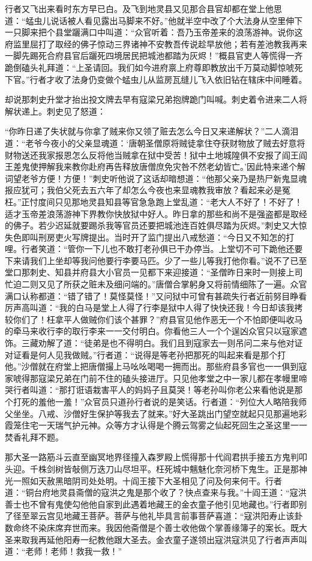\documentclass[12pt,UTF8]{ctexbook}
\begin{document}
{	行者又飞出来看时东方早已白。及飞到地灵县又见那合县官却都在堂上他思道：“蜢虫儿说话被人看见露出马脚来不好。”他就半空中改了个大法身从空里伸下一只脚来把个县堂躧满口中叫道：“众官听着：吾乃玉帝差来的浪荡游神。说你这府监里屈打了取经的佛子惊动三界诸神不安教吾传说趁早放他；若有差池教我再来一脚先踢死合府县官后躧死四境居民把城池都踏为灰烬！”概县官吏人等慌得一齐跪倒磕头礼拜道：“上圣请回。我们如今进府禀上府尊即教放出千万莫动脚惊唬死下官。”行者才收了法身仍变做个蜢虫儿从监房瓦缝儿飞入依旧钻在辖床中间睡着。
	
	却说那刺史升堂才抬出投文牌去早有寇梁兄弟抱牌跪门叫喊。刺史着令进来二人将解状递上。刺史见了怒道：
	
	“你昨日递了失状就与你拿了贼来你又领了赃去怎么今日又来递解状？”二人滴泪道：“老爷今夜小的父亲显魂道：‘唐朝圣僧原将贼徒拿住夺获财物放了贼去好意将财物送还我家报恩怎么反将他当贼拿在狱中受苦！狱中土地城隍俱不安报了阎王阎王差鬼使押解我来教你赴府再告释放唐僧庶免灾咎不然老幼皆亡。’因此特来递个解词望老爷方便！方便！”刺史听他说了这话却暗想道：“他那父亲乃是热尸新鬼显魂报应犹可；我伯父死去五六年了却怎么今夜也来显魂教我审放？看起来必是冤枉。”正忖度间只见那地灵县知县等官急急跑上堂乱道：“老大人不好了！不好了！适才玉帝差浪荡游神下界教你快放狱中好人。昨日拿的那些和尚不是强盗都是取经的佛子。若少迟延就要踢杀我等官员还要把城池连百姓俱尽踏为灰烬。”刺史又大惊失色即叫刑房吏火写牌提出。当时开了监门提出八戒愁道：“今日又不知怎的打哩。行者笑道：“管你一下儿也不敢打老孙俱已干办停当。上堂切不可下跪他还要下来请我们上坐却等我问他要行李要马匹。少了一些儿等我打他你看。”说不了已至堂口那刺史、知县并府县大小官员一见都下来迎接道：“圣僧昨日来时一则接上司忙迫二则又见了所获之赃未及细问端的。”唐僧合掌躬身又将前情细陈了一遍。众官满口认称都道：“错了错了！莫怪莫怪！”又问狱中可曾有甚疏失行者近前努目睁看厉声高叫道：“我的白马是堂上人得了行李是狱中人得了快快还我！今日却该我拷较你们了！枉拿平人做贼你们该个甚罪？”府县官见他作恶无一个不怕即便叫收马的牵马来收行李的取行李来一一交付明白。你看他三人一个个逞凶众官只以寇家遮饰。三藏劝解了道：“徒弟是也不得明白。我们且到寇家去一则吊问二来与他对证对证看是何人见我做贼。”行者道：“说得是等老孙把那死的叫起来看是那个打他。”沙僧就在府堂上把唐僧撮上马吆吆喝喝一拥而出。那些府县多官也一一俱到寇家唬得那寇梁兄弟在门前不住的磕头接进厅。只见他孝堂之中一家儿都在孝幔里啼哭行者叫道：“那打诳语栽害平人的妈妈子且莫哭！等老孙叫你老公来看他说是那个打死的羞他一羞！”众官员只道孙行者说的是笑话。行者道：“列位大人略陪我师父坐坐。八戒、沙僧好生保护等我去了就来。”好大圣跳出门望空就起只见那遍地彩霞笼住宅一天瑞气护元神。众等方才认得是个腾云驾雾之仙起死回生之圣这里一一焚香礼拜不题。
	
	那大圣一路筋斗云直至幽冥地界径撞入森罗殿上慌得那十代阎君拱手接五方鬼判叩头迎。千株剑树皆敧侧万迭刀山尽坦平。枉死城中魑魅化奈河桥下鬼生。正是那神光一照如天赦黑暗阴司处处明。十阎王接下大圣相见了问及何来何干。行者道：“铜台府地灵县斋僧的寇洪之鬼是那个收了？快点查来与我。”十阎王道：“寇洪善士也不曾有鬼使勾他他自家到此遇着地藏王的金衣童子他引见地藏也。”行者即别了径至翠云宫见地藏王菩萨。菩萨与他礼毕具言前事菩萨喜道：“寇洪阳寿止该卦数命终不染床席弃世而来。我因他斋僧是个善士收他做个掌善缘簿子的案长。既大圣来取我再延他阳寿一纪教他跟大圣去。金衣童子遂领出寇洪寇洪见了行者声声叫道：“老师！老师！救我一救！”
	
}
\end{document}
